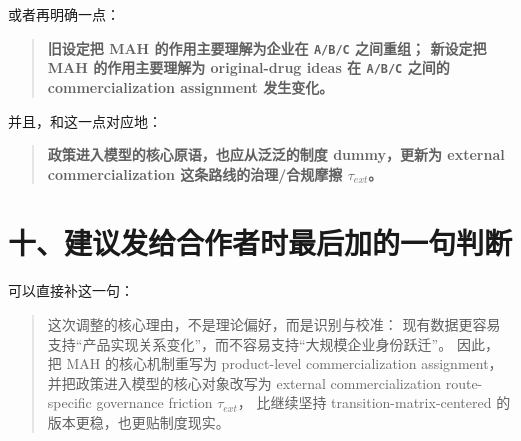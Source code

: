 \documentclass[12pt]{ctexart}
\begin{document}
或者再明确一点：

\begin{quote}
\textbf{旧设定把 MAH 的作用主要理解为企业在 \texttt{A/B/C} 之间重组；
新设定把 MAH 的作用主要理解为 original-drug ideas 在 \texttt{A/B/C}
之间的 commercialization assignment 发生变化。}
\end{quote}

并且，和这一点对应地：

\begin{quote}
\textbf{政策进入模型的核心原语，也应从泛泛的制度 dummy，更新为
external commercialization 这条路线的治理/合规摩擦
\(\tau_{ext}\)。}
\end{quote}

\section{十、建议发给合作者时最后加的一句判断}

可以直接补这一句：

\begin{quote}
这次调整的核心理由，不是理论偏好，而是识别与校准：
现有数据更容易支持“产品实现关系变化”，而不容易支持“大规模企业身份跃迁”。
因此，把 MAH 的核心机制重写为
product-level commercialization assignment，
并把政策进入模型的核心对象改写为
external commercialization route-specific governance friction
\(\tau_{ext}\)，
比继续坚持 transition-matrix-centered 的版本更稳，也更贴制度现实。
\end{quote}
\end{document}
